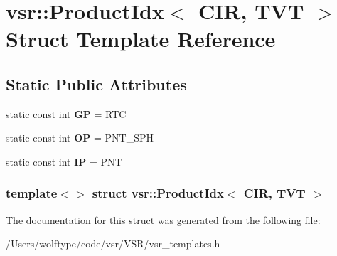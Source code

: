 \hypertarget{structvsr_1_1_product_idx_3_01_c_i_r_00_01_t_v_t_01_4}{\section{vsr\-:\-:Product\-Idx$<$ C\-I\-R, T\-V\-T $>$ Struct Template Reference}
\label{structvsr_1_1_product_idx_3_01_c_i_r_00_01_t_v_t_01_4}
}
\subsection*{Static Public Attributes}
\begin{DoxyCompactItemize}
\item 
\hypertarget{structvsr_1_1_product_idx_3_01_c_i_r_00_01_t_v_t_01_4_ac92c025af6741a4044fc0e1b1cb63ad6}{static const int {\bfseries G\-P} = R\-T\-C}\label{structvsr_1_1_product_idx_3_01_c_i_r_00_01_t_v_t_01_4_ac92c025af6741a4044fc0e1b1cb63ad6}

\item 
\hypertarget{structvsr_1_1_product_idx_3_01_c_i_r_00_01_t_v_t_01_4_aeda8c185a1e279c901607a168f533dcb}{static const int {\bfseries O\-P} = P\-N\-T\-\_\-\-S\-P\-H}\label{structvsr_1_1_product_idx_3_01_c_i_r_00_01_t_v_t_01_4_aeda8c185a1e279c901607a168f533dcb}

\item 
\hypertarget{structvsr_1_1_product_idx_3_01_c_i_r_00_01_t_v_t_01_4_aa6a74deb19c04c5cb28da625b487e285}{static const int {\bfseries I\-P} = P\-N\-T}\label{structvsr_1_1_product_idx_3_01_c_i_r_00_01_t_v_t_01_4_aa6a74deb19c04c5cb28da625b487e285}

\end{DoxyCompactItemize}
\subsubsection*{template$<$$>$ struct vsr\-::\-Product\-Idx$<$ C\-I\-R, T\-V\-T $>$}



The documentation for this struct was generated from the following file\-:\begin{DoxyCompactItemize}
\item 
/\-Users/wolftype/code/vsr/\-V\-S\-R/vsr\-\_\-templates.\-h\end{DoxyCompactItemize}
